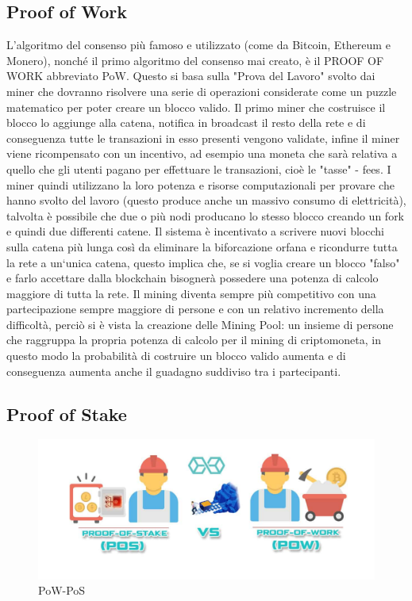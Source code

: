 \documentclass[11pt,a4paper,titlepage,twoside,openright]{report}
\begin{document}
\subsection{Proof of Work}
L'algoritmo del consenso più famoso e utilizzato (come da Bitcoin, Ethereum e Monero), nonché il primo algoritmo del consenso mai creato, è il PROOF OF WORK abbreviato PoW. Questo si basa sulla "Prova del Lavoro" svolto dai miner che dovranno risolvere una serie di operazioni considerate come un puzzle matematico per poter creare un blocco valido. Il primo miner che costruisce il blocco lo aggiunge alla catena, notifica in broadcast il resto della rete e di conseguenza tutte le transazioni in esso presenti vengono validate, infine il miner viene ricompensato con un incentivo, ad esempio una moneta che sarà relativa a quello che gli utenti pagano per effettuare le transazioni, cioè le "tasse" - fees. I miner quindi utilizzano la loro potenza e risorse computazionali per provare che hanno svolto del lavoro (questo produce anche un massivo consumo di elettricità), talvolta è possibile che due o più nodi producano lo stesso blocco creando un fork e quindi due differenti catene. Il sistema è incentivato a scrivere nuovi blocchi sulla catena più lunga così da eliminare la biforcazione orfana e ricondurre tutta la rete a un`unica catena, questo implica che, se si voglia creare un blocco "falso" e farlo accettare dalla blockchain bisognerà possedere una potenza di calcolo maggiore di tutta la rete. Il mining diventa sempre più competitivo con una partecipazione sempre maggiore di persone e con un relativo incremento della difficoltà, perciò si è vista la creazione delle Mining Pool: un insieme di persone che raggruppa la propria potenza di calcolo per il mining di criptomoneta, in questo modo la probabilità di costruire un blocco valido aumenta e di conseguenza aumenta anche il guadagno suddiviso tra i partecipanti.

\subsection{Proof of Stake}
\begin{figure}[h]
	\includegraphics[width=\textwidth]{pow-pos}
	\centering
	\caption{PoW-PoS}
	\label{fig:pow-pos}
\end{figure}
\end{document}
